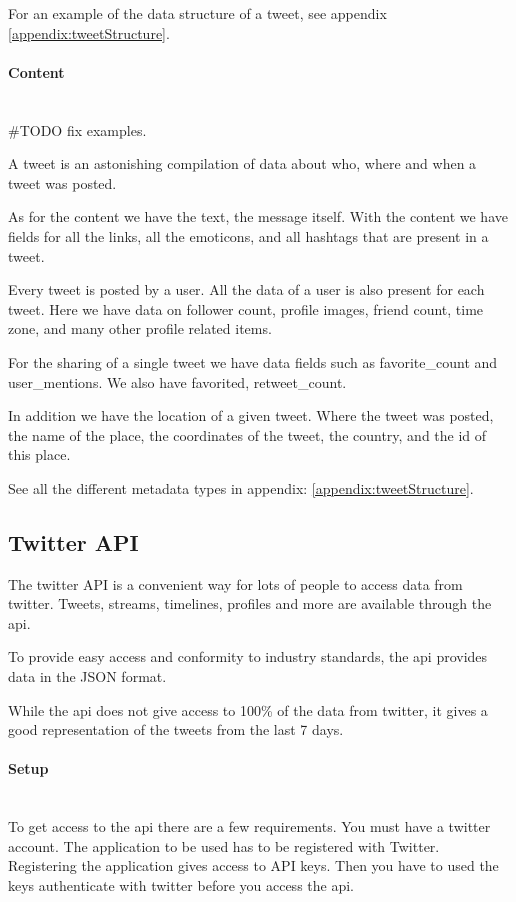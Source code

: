 For an example of the data structure of a tweet, see appendix
\ref{appendix:tweetStructure}.

\paragraph{Content}
\hspace{0pt}\\

#TODO fix examples. 

A tweet is an astonishing compilation of data about who, where and when a tweet
was posted.

As for the content we have the text, the message itself. With the content we
have fields for all the links, all the emoticons, and all hashtags that are
present in a tweet. 

Every tweet is posted by a user. All the data of a user is also present for
each tweet. Here we have data on follower count, profile images, friend count,
time zone, and many other profile related items. 

For the sharing of a single tweet we have data fields such as favorite\_count
and user\_mentions. We also have favorited, retweet\_count. 

In addition we have the location of a given tweet. Where the tweet was posted,
the name of the place, the coordinates of the tweet, the country, and the id of
this place. 

See all the different metadata types in appendix: \ref{appendix:tweetStructure}.
%

\subsection{Twitter API}
The twitter API is a convenient way for lots of people to access data from
twitter. Tweets, streams, timelines, profiles and more are available through
the api. 

To provide easy access and conformity to industry standards, the api
provides data in the JSON format. 

While the api does not give access to 100\% of the data from twitter, it gives
a good representation of the tweets from the last 7 days.
%

\paragraph{Setup}
\hspace{0pt}\\
To get access to the api there are a few requirements. You must have a
twitter account. The application to be used has to be registered with Twitter.
Registering the application gives access to API keys. Then you have to used the
keys authenticate with twitter before you access the api. 

